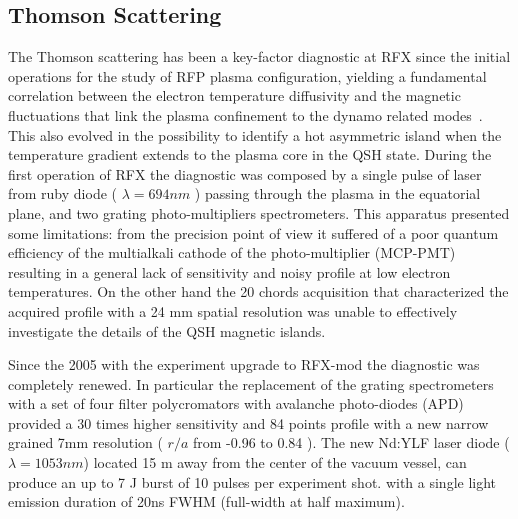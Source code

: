 \subsection{Thomson Scattering}
The Thomson scattering  has been a key-factor diagnostic at RFX since the initial operations for the study of RFP plasma configuration, yielding a fundamental correlation between the electron temperature diffusivity and the magnetic fluctuations that link the plasma confinement to the dynamo related modes~\cite{}. This also evolved in the possibility to identify a hot asymmetric island when the temperature gradient extends to the plasma core in the \ac{QSH} state.
During the first operation of RFX the diagnostic was composed by a single pulse of laser from ruby diode ( $\lambda = 694 nm$ ) passing through the plasma in the equatorial plane, and two grating photo-multipliers spectrometers.
This apparatus presented some limitations: from the precision point of view it suffered of a poor quantum efficiency of the multialkali cathode of the photo-multiplier (MCP-PMT) resulting in a general lack of sensitivity and noisy profile at low electron temperatures. On the other hand the 20 chords acquisition that characterized the acquired profile with a 24 mm spatial resolution was unable to effectively investigate the details of the QSH magnetic islands.

Since the 2005 with the experiment upgrade to RFX-mod the diagnostic was completely renewed. In particular the replacement of the grating spectrometers with a set of four filter polycromators with avalanche photo-diodes (APD) provided a 30 times higher sensitivity and 84 points profile with a new narrow grained 7mm resolution ( $r/a$ from -0.96 to 0.84 ).
The new Nd:YLF laser diode ($\lambda=1053 nm$) located 15 m away from the center of the vacuum vessel, can produce an up to 7 J burst of 10 pulses per experiment shot. with a single light emission duration of 20ns FWHM (full-width at half maximum).

